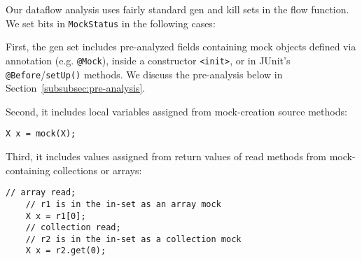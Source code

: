 


Our dataflow analysis uses fairly standard gen and kill sets in the flow function. We set bits in \texttt{MockStatus} in the following cases:

First, the gen set includes pre-analyzed fields containing mock objects defined via annotation (e.g. \texttt{@Mock}), inside a constructor \texttt{<init>}, or in JUnit's \texttt{@Before}/\texttt{setUp()} methods. We discuss the pre-analysis below in Section~\ref{subsubsec:pre-analysis}. 

Second, it includes local variables assigned from mock-creation source methods:
\begin{lstlisting}[basicstyle=\ttfamily\small,numbers=none]
    X x = mock(X);
\end{lstlisting}

Third, it includes values assigned from return values of read methods from mock-containing collections or arrays:
\begin{lstlisting}[basicstyle=\ttfamily\small,numbers=none]
    // array read;
    // r1 is in the in-set as an array mock
    X x = r1[0];
    // collection read;
    // r2 is in the in-set as a collection mock
    X x = r2.get(0);
\end{lstlisting}

